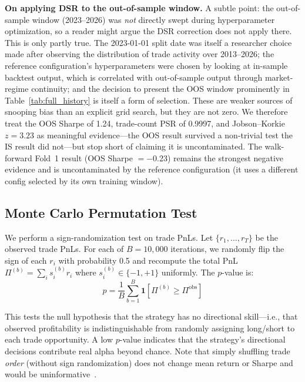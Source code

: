 \documentclass{article}
\begin{document}
\textbf{On applying DSR to the out-of-sample window.}
A subtle point: the out-of-sample window (2023--2026) was \emph{not} directly swept during hyperparameter optimization, so a reader might argue the DSR correction does not apply there.
This is only partly true.
The 2023-01-01 split date was itself a researcher choice made after observing the distribution of trade activity over 2013--2026; the reference configuration's hyperparameters were chosen by looking at in-sample backtest output, which is correlated with out-of-sample output through market-regime continuity; and the decision to present the OOS window prominently in Table~\ref{tab:full_history} is itself a form of selection.
These are weaker sources of snooping bias than an explicit grid search, but they are not zero.
We therefore treat the OOS Sharpe of 1.24, trade-count PSR of 0.9997, and Jobson--Korkie $z = 3.23$ as meaningful evidence---the OOS result survived a non-trivial test the IS result did not---but stop short of claiming it is uncontaminated.
The walk-forward Fold~1 result (OOS Sharpe $= -0.23$) remains the strongest negative evidence and is uncontaminated by the reference configuration (it uses a different config selected by its own training window).

\subsection{Monte Carlo Permutation Test}

We perform a sign-randomization test on trade PnLs.
Let $\{r_1, \ldots, r_T\}$ be the observed trade PnLs.
For each of $B = 10{,}000$ iterations, we randomly flip the sign of each $r_i$ with probability 0.5 and recompute the total PnL $\Pi^{(b)} = \sum_i s_i^{(b)} r_i$ where $s_i^{(b)} \in \{-1, +1\}$ uniformly.
The $p$-value is:
\begin{equation}
  p = \frac{1}{B} \sum_{b=1}^{B} \mathbf{1}[\Pi^{(b)} \geq \Pi^{\text{obs}}]
  \label{eq:mc_pval}
\end{equation}

This tests the null hypothesis that the strategy has no directional skill---i.e., that observed profitability is indistinguishable from randomly assigning long/short to each trade opportunity.
A low $p$-value indicates that the strategy's directional decisions contribute real alpha beyond chance.
Note that simply shuffling trade \emph{order} (without sign randomization) does not change mean return or Sharpe and would be uninformative~\citep{LopezDePrado2018}.
\end{document}
